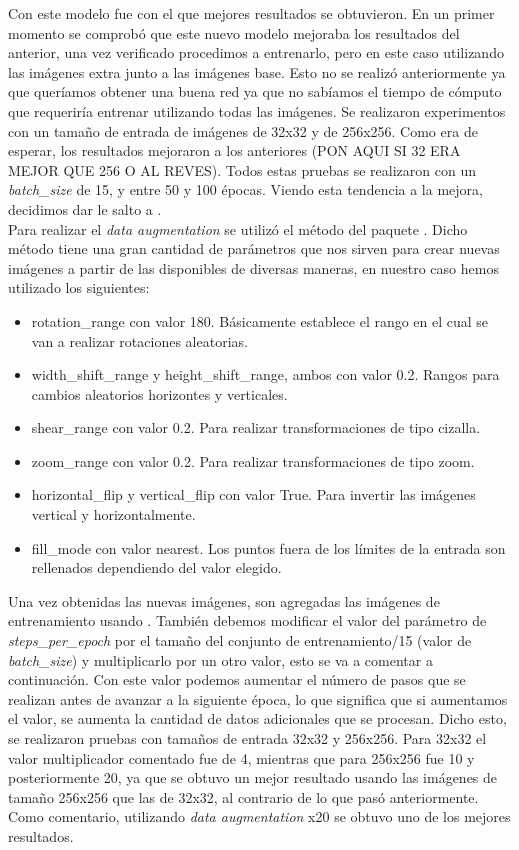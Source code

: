 Con este modelo fue con el que mejores resultados se obtuvieron. En un primer momento se comprobó que este nuevo modelo mejoraba los resultados del anterior, una vez verificado procedimos a entrenarlo, pero en este caso utilizando las imágenes extra junto a las imágenes base. Esto no se realizó anteriormente ya que queríamos obtener una buena red ya que no sabíamos el tiempo de cómputo que requeriría entrenar utilizando todas las imágenes. Se realizaron experimentos con un tamaño de entrada de imágenes de 32x32 y de 256x256. Como era de esperar, los resultados mejoraron a los anteriores (PON AQUI SI 32 ERA MEJOR QUE 256 O AL REVES). Todos estas pruebas se realizaron con un
\textit{batch\_size} de 15, y entre 50 y 100 épocas. Viendo esta tendencia a la mejora, decidimos dar le salto a .\\

Para realizar el \textit{data augmentation} se utilizó el método  del paquete . Dicho método tiene una gran cantidad de parámetros que nos sirven para crear nuevas imágenes a partir de las disponibles de diversas maneras, en nuestro caso hemos utilizado los siguientes:

\begin{itemize}
\item rotation\_range con valor 180. Básicamente establece el rango en el cual se van a realizar rotaciones aleatorias.
\item width\_shift\_range y height\_shift\_range, ambos con valor 0.2. Rangos para cambios aleatorios horizontes y verticales.
\item shear\_range con valor 0.2. Para realizar transformaciones de tipo cizalla.
\item zoom\_range con valor 0.2. Para realizar transformaciones de tipo zoom.
\item horizontal\_flip y vertical\_flip con valor True. Para invertir las imágenes vertical y horizontalmente.
\item fill\_mode con valor nearest. Los puntos fuera de los límites de la entrada son rellenados dependiendo del valor elegido.
\end{itemize}

Una vez obtenidas las nuevas imágenes, son agregadas las imágenes de entrenamiento usando . También debemos modificar el valor del parámetro de \textit{steps\_per\_epoch} por el tamaño del conjunto de entrenamiento/15 (valor de \textit{batch\_size}) y multiplicarlo por un otro valor, esto se va a comentar a continuación. Con este valor podemos aumentar el número de pasos que se realizan antes de avanzar a la siguiente época, lo que significa que si aumentamos el valor, se aumenta la cantidad de datos adicionales que se procesan. Dicho esto, se realizaron pruebas con tamaños de entrada 32x32 y 256x256. Para 32x32 el valor multiplicador comentado fue de 4, mientras que para 256x256 fue 10 y posteriormente 20, ya que se obtuvo un mejor resultado usando las imágenes de tamaño 256x256 que las de 32x32, al contrario de lo que pasó anteriormente. Como comentario, utilizando \textit{data augmentation} x20 se obtuvo uno de los mejores resultados.

